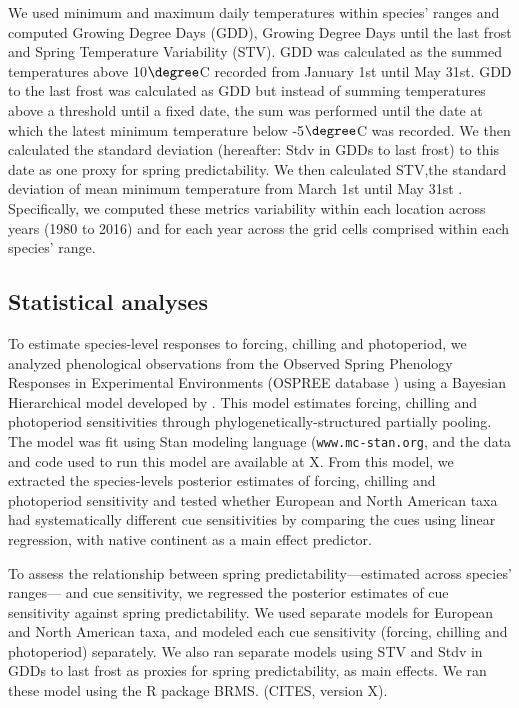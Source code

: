 \documentclass[12pt]{article}
\begin{document}
We used minimum and maximum daily temperatures within species' ranges and computed Growing Degree Days (GDD), Growing Degree Days until the last frost and Spring Temperature Variability (STV). GDD was calculated as the summed temperatures above 10$\degree$C recorded from January 1st until May 31st. GDD to the last frost was calculated as GDD but instead of summing temperatures above a threshold until a fixed date, the sum was performed until the date at which the latest minimum temperature below -5$\degree$C was recorded. We then calculated the standard deviation (hereafter: Stdv in GDDs to last frost) to this date as one proxy for spring predictability. We then calculated STV,the standard deviation of mean minimum temperature from March 1st until May 31st \citep{Zohner:2017aa}.  Specifically, we computed these metrics variability within each location across years (1980 to 2016) and for each year across the grid cells comprised within each species' range.

\subsection*{Statistical analyses}
To estimate species-level responses to forcing, chilling and photoperiod, we analyzed phenological observations from the Observed Spring Phenology Responses in Experimental Environments (OSPREE database \citep{wolkovich2019}) using a Bayesian Hierarchical model developed by \citet{Morales-Castilla:2024vp}. This model estimates forcing, chilling and photoperiod sensitivities through phylogenetically-structured partially pooling. The model was fit using Stan modeling language \citep{Carpenter2017}(\texttt{www.mc-stan.org}, and the data and code used to run this model are available at X. From this model, we extracted the species-levels posterior estimates of forcing, chilling and photoperiod sensitivity and tested whether European and North American taxa had systematically different cue sensitivities by comparing the cues using linear regression, with native continent as a main effect predictor. 

To assess the relationship between spring predictability---estimated across species' ranges--- and cue sensitivity, we regressed the posterior estimates of cue sensitivity against spring predictability. We used separate models for European and North American taxa, and modeled each cue sensitivity (forcing, chilling and photoperiod) separately. We also ran separate models using STV and Stdv in GDDs to last frost as proxies for spring predictability, as main effects. We ran these model using the R package BRMS. (CITES, version X). 
\end{document}

